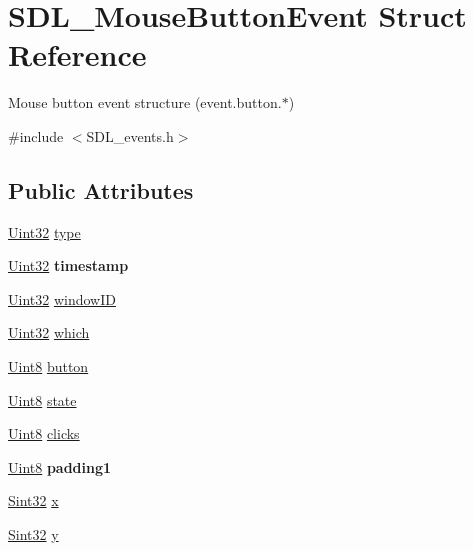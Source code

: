 \hypertarget{struct_s_d_l___mouse_button_event}{}\section{S\+D\+L\+\_\+\+Mouse\+Button\+Event Struct Reference}
\label{struct_s_d_l___mouse_button_event}


Mouse button event structure (event.\+button.$\ast$)  




{\ttfamily \#include $<$S\+D\+L\+\_\+events.\+h$>$}

\subsection*{Public Attributes}
\begin{DoxyCompactItemize}
\item 
\hyperlink{_s_d_l__stdinc_8h_add440eff171ea5f55cb00c4a9ab8672d}{Uint32} \hyperlink{struct_s_d_l___mouse_button_event_af64cb09ea68b8081ecc8ee498552e3d7}{type}
\item 
\mbox{\label{struct_s_d_l___mouse_button_event_ab05e8a454692608ff56c502e95799c56}} 
\hyperlink{_s_d_l__stdinc_8h_add440eff171ea5f55cb00c4a9ab8672d}{Uint32} {\bfseries timestamp}
\item 
\hyperlink{_s_d_l__stdinc_8h_add440eff171ea5f55cb00c4a9ab8672d}{Uint32} \hyperlink{struct_s_d_l___mouse_button_event_ab3b855d4b543b5d02fcf5d56e4421393}{window\+ID}
\item 
\hyperlink{_s_d_l__stdinc_8h_add440eff171ea5f55cb00c4a9ab8672d}{Uint32} \hyperlink{struct_s_d_l___mouse_button_event_a366aef59a0f393afc8a3561e741825df}{which}
\item 
\hyperlink{_s_d_l__stdinc_8h_a2944638813a090aa23e62f4da842c3e2}{Uint8} \hyperlink{struct_s_d_l___mouse_button_event_a1a4680e19ae06d02d2093f0bcba1b24c}{button}
\item 
\hyperlink{_s_d_l__stdinc_8h_a2944638813a090aa23e62f4da842c3e2}{Uint8} \hyperlink{struct_s_d_l___mouse_button_event_a8809cef85cfffad4f2059f2ba4fc6a3d}{state}
\item 
\hyperlink{_s_d_l__stdinc_8h_a2944638813a090aa23e62f4da842c3e2}{Uint8} \hyperlink{struct_s_d_l___mouse_button_event_aa606bebcbc3ffc7e932016039c2a36a1}{clicks}
\item 
\mbox{\label{struct_s_d_l___mouse_button_event_a765957d218d16fa00558fa4d20e80689}} 
\hyperlink{_s_d_l__stdinc_8h_a2944638813a090aa23e62f4da842c3e2}{Uint8} {\bfseries padding1}
\item 
\hyperlink{_s_d_l__stdinc_8h_a7a90b941db9d4582e9ad7abb9940ff7e}{Sint32} \hyperlink{struct_s_d_l___mouse_button_event_a5bb9c61b86e999f58637511e32e3a076}{x}
\item 
\hyperlink{_s_d_l__stdinc_8h_a7a90b941db9d4582e9ad7abb9940ff7e}{Sint32} \hyperlink{struct_s_d_l___mouse_button_event_a7ccb5c55a7ddadce723f4ea6d5269540}{y}
\end{DoxyCompactItemize}


